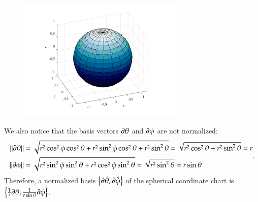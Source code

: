 \documentclass[11pt, a4paper]{book}
\begin{document}
\begin{Example}
\begin{figure}[htbp]
    \centering
    \includegraphics[width=0.7\textwidth, height=\textheight, keepaspectratio]{figures/basis-on-sphere}
    \caption{}
    \label{fig:basis-on-sphere}
  \end{figure}
  We also notice that the basis vectors $\boldsymbol{\partial}\theta$ and $\boldsymbol{\partial}\phi$ are
  not normalized:
  \begin{equation*}
    \begin{aligned}
      \lVert\boldsymbol{\partial}\theta\rVert &= \sqrt{r^2\cos^2\phi\cos^{2}\theta +
        r^2\sin^2\phi\cos^2\theta + r^2\sin^2\theta} = \sqrt{r^2\cos^2\theta +
        r^2\sin^2\theta} = r \\
      \lVert\boldsymbol{\partial}\phi\rVert &= \sqrt{r^2\sin^2\phi\sin^2\theta +
        r^2\cos^2\phi\sin^2\theta} = \sqrt{r^2\sin^2\theta} = r\sin\theta
    \end{aligned}.
  \end{equation*}
  Therefore, a normalized basis
  $\left\{ \boldsymbol{\partial}\hat{\theta}, \boldsymbol{\partial}\hat{\phi} \right\}$ of the spherical
  coordinate chart is
  $\left\{ \frac{1}{r} \boldsymbol{\partial}\theta, \frac{1}{r\sin\theta} \boldsymbol{\partial}\phi
  \right\}$.
\end{Example}
\end{document}
